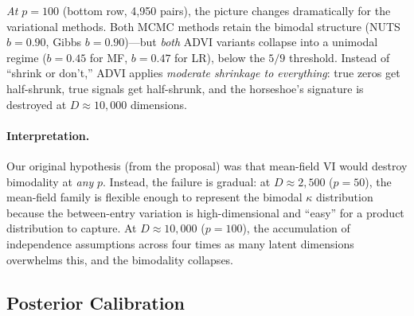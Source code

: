 \documentclass[10pt,conference,compsoc]{IEEEtran}
\begin{document}
\emph{At $p = 100$} (bottom row, 4{,}950 pairs), the picture changes dramatically for the variational methods. Both MCMC methods retain the bimodal structure (NUTS $b = 0.90$, Gibbs $b = 0.90$)---but \emph{both} ADVI variants collapse into a unimodal regime ($b = 0.45$ for MF, $b = 0.47$ for LR), below the $5/9$ threshold. Instead of ``shrink or don't,'' ADVI applies \emph{moderate shrinkage to everything}: true zeros get half-shrunk, true signals get half-shrunk, and the horseshoe's signature is destroyed at $D \approx 10{,}000$ dimensions.

\paragraph{Interpretation.} Our original hypothesis (from the proposal) was that mean-field VI would destroy bimodality at \emph{any} $p$. Instead, the failure is gradual: at $D \approx 2{,}500$ ($p{=}50$), the mean-field family is flexible enough to represent the bimodal $\kappa$ distribution because the between-entry variation is high-dimensional and ``easy'' for a product distribution to capture. At $D \approx 10{,}000$ ($p{=}100$), the accumulation of independence assumptions across four times as many latent dimensions overwhelms this, and the bimodality collapses.

\subsection{Posterior Calibration}
\end{document}
